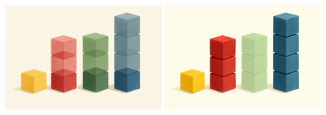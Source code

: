 \documentclass{article}
\begin{document}
\includegraphics[width=0.45\textwidth]{count-by-layer.png}
\hfil
\includegraphics[width=0.45\textwidth]{count-by-pile.png}
\end{document}
